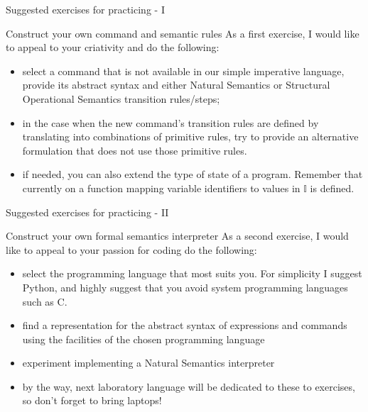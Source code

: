 \documentclass[aspectratio=169]{beamer}
\begin{document}
\begin{slide}{Suggested exercises for practicing - I}
\begin{block}{Construct your own command and semantic rules}
As a first exercise, I would like to appeal to your criativity and do the following:
\begin{itemize}
  \item select a command that is not available in our simple imperative language, provide its abstract syntax and either Natural Semantics or Structural Operational Semantics transition rules/steps; 
  \item in the case when the new command's transition rules are defined by translating into combinations of primitive rules, try to provide an alternative formulation that does not use those primitive rules.
  \item if needed, you can also extend the type of state of a program. Remember that currently on a function mapping variable identifiers to values in $\mathbb{I}$ is defined.
\end{itemize}
\end{block}  
\end{slide}

\begin{slide}{Suggested exercises for practicing - II}
\begin{block}{Construct your own formal semantics interpreter}
As a second exercise, I would like to appeal to your passion for coding do the following:
\begin{itemize}
  \item select the programming language that most suits you. For simplicity I suggest Python, and highly suggest that you avoid system programming languages such as C.
  \item find a representation for the abstract syntax of expressions and commands using the facilities of the chosen programming language
  \item  experiment implementing a Natural Semantics interpreter
  \item by the way, next laboratory language will be dedicated to these to exercises, so don't forget to bring laptops!
\end{itemize}
\end{block}  
\end{slide}
\end{document}
